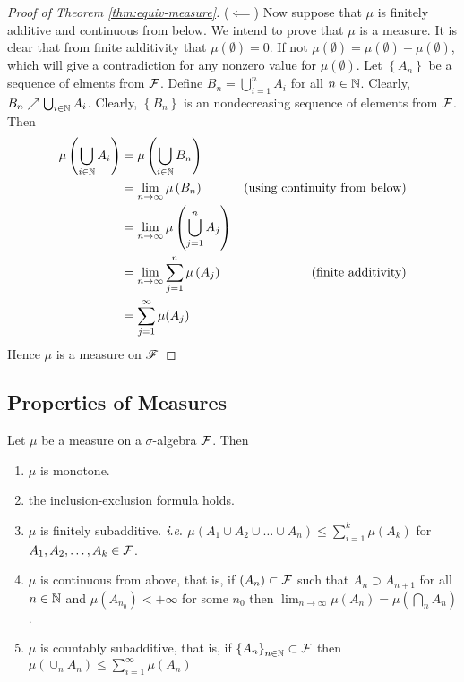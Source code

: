 \begin{proof}[Proof of Theorem \ref{thm:equiv-measure}]
    ($\impliedby$) Now suppose that $\mu$ is finitely additive and continuous from below.
    We intend to prove that $\mu$ is a measure. It is clear that from finite additivity that $\mu \left( \emptyset \right) = 0$. If not $\mu \left( \emptyset \right) = \mu \left( \emptyset \right) + \mu\left( \emptyset \right)$, which will give a contradiction for any nonzero value for $\mu \left( \emptyset \right)$. Let $\left\{ A_n \right\}$ be a sequence of elments from ${\cal F}$. Define $B_n = \bigcup_{i=1}^{n} A_i$ for all $n\in \mathbb N$. Clearly, $B_n \nearrow \bigcup_{i \in \mathbb N} A_i$. Clearly, $\left\{ B_n \right\}$ is an nondecreasing sequence of elements from ${\cal F}$. Then
    \begin{align*}
        \mu \left( \bigcup_{i \in \mathbb N} A_i \right) &= \mu \left( \bigcup_{i \in \mathbb N} B_n \right) &\\
        &= \lim_{n \to \infty} \mu\left( B_n \right) & \text{(using continuity from below)} \\
        &= \lim_{n \to \infty} \mu \left( \bigcup_{j=1}^{n} A_j \right) & \\
        &= \lim_{n \to \infty} \sum_{j=1}^{n} \mu \left( A_j \right) & \text{(finite additivity)} \\
        &= \sum_{j=1}^{\infty} \mu (A_j) 
    \end{align*}
    Hence $\mu$ is a measure on ${\mathscr F}$
\end{proof}



\subsection{Properties of Measures}

\begin{theorem}
    \label{thm:prop-measures}
    Let $\mu$ be a measure on a $\sigma$-algebra ${\cal F}$. Then
    \begin{enumerate}[label=(\arabic*)]
	    \item $\mu$ is monotone.
	    \item the inclusion-exclusion formula holds.
	    \item $\mu$ is finitely subadditive. $\textit{i}.\textit{e}.$ $\mu \left( A_1 \cup A_2 \cup \ldots \cup A_n \right) \le \sum_{i=1}^{k} \mu (A_k)$ for $A_1, A_2, \ldots , A_k \in {\cal F}	$.
	    \item $\mu$ is continuous from above, that is, if $\left( A_n \right) \subset {\cal F}$ such that $A_n \supset A_{n+1}$ for all $n\in\mathbb N$ and $\mu (A_{n_0}) < +\infty$ for some $n_0$ then $\lim_{n \to \infty} \mu(A_n) = \mu \left( \bigcap_n A_n \right)$.
	    \item $\mu$ is countably subadditive, that is, if $\left\{ A_n \right\}_{n\in \mathbb N}\subset {\cal F}$ then $\mu \left(\cup_n A_n \right) \le \sum_{i=1}^{\infty} \mu \left( A_n \right)$
    \end{enumerate}
\end{theorem}

